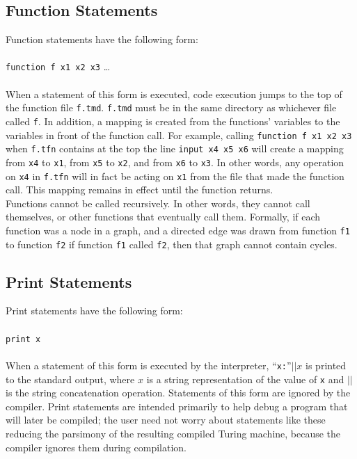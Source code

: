 \documentclass{report}
\begin{document}
\subsection{Function Statements}

Function statements have the following form: \\ \\
\texttt{function f x1 x2 x3} \dots \\ \\ 
When a statement of this form is executed, code execution jumps to the top of the function file \texttt{f.tmd}. \texttt{f.tmd} must be in the same directory as whichever file called \texttt{f}. In addition, a mapping is created from the functions' variables to the variables in front of the function call. For example, calling \texttt{function f x1 x2 x3} when \texttt{f.tfn} contains at the top the line \texttt{input x4 x5 x6} will create a mapping from \texttt{x4} to \texttt{x1}, from \texttt{x5} to \texttt{x2}, and from \texttt{x6} to \texttt{x3}. In other words, any operation on \texttt{x4} in \texttt{f.tfn} will in fact be acting on \texttt{x1} from the file that made the function call. This mapping remains in effect until the function returns. \\

Functions cannot be called recursively. In other words, they cannot call themselves, or other functions that eventually call them. Formally, if each function was a node in a graph, and a directed edge was drawn from function \texttt{f1} to function \texttt{f2} if function \texttt{f1} called \texttt{f2}, then that graph cannot contain cycles.

\subsection{Print Statements}

Print statements have the following form: \\ \\ 
\texttt{print x} \\ \\ 
When a statement of this form is executed by the interpreter, ``\texttt{x:}''$|| x$ is printed to the standard output, where $x$ is a string representation of the value of \texttt{x} and $||$ is the string concatenation operation. Statements of this form are ignored by the compiler. Print statements are intended primarily to help debug a program that will later be compiled; the user need not worry about statements like these reducing the parsimony of the resulting compiled Turing machine, because the compiler ignores them during compilation.
\end{document}
